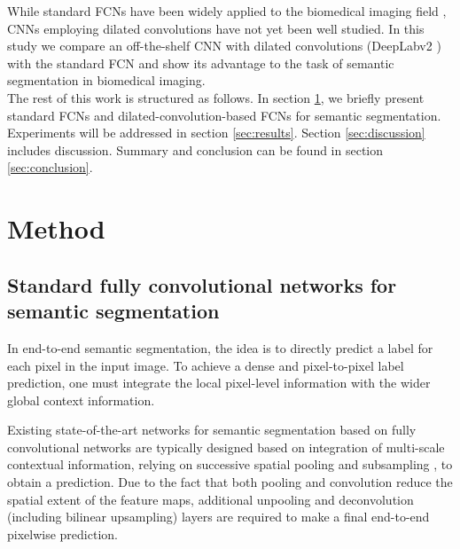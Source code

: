 \documentclass[a4paper]{mva_style}
\begin{document}
\indent While standard FCNs have been widely applied to the biomedical imaging field \cite{wang2016deep,roth2016spatial,bentaieb2016topology,xu2016gland,ben2016fully}, CNNs employing dilated convolutions have not yet been well studied. In this study we compare an off-the-shelf CNN with dilated convolutions (DeepLabv2 \cite{chen2016deeplab}) with the standard FCN \cite{long2015fully} and show its advantage to the task of semantic segmentation in biomedical imaging.\\
\indent The rest of this work is structured as follows. In section \ref{sec:method}, we briefly present standard FCNs \cite{long2015fully} and dilated-convolution-based FCNs for semantic segmentation. Experiments will be addressed in section  \ref{sec:results}. Section \ref{sec:discussion} includes discussion. Summary and conclusion can be found in section \ref{sec:conclusion}.
\section{Method}
\label{sec:method}
\subsection{Standard fully convolutional networks for semantic segmentation}
In end-to-end semantic segmentation, the idea is to directly predict a label for each pixel in the input image. To achieve a dense and pixel-to-pixel label prediction, one must integrate the local pixel-level information with the wider global context information.

Existing state-of-the-art networks for semantic segmentation based on fully convolutional networks \cite{long2015fully} are typically designed based on integration of multi-scale contextual information, relying on successive spatial pooling and subsampling \cite{Yu2016multi}, to obtain a prediction. Due to the fact that both pooling and convolution reduce the spatial extent of the feature maps, additional unpooling and deconvolution (including bilinear upsampling) layers are required to make a final end-to-end pixelwise prediction. 
\end{document}
